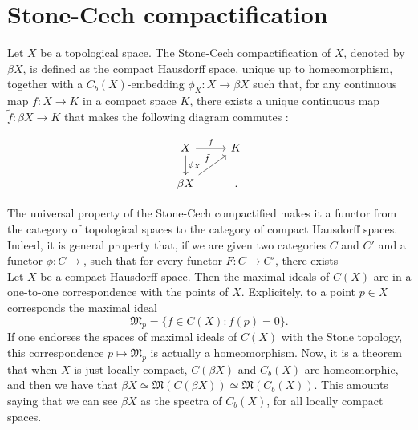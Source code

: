 \section{Stone-Cech compactification}

Let $X$ be a topological space. The Stone-Cech compactification of $X$, denoted by $\beta X$, is defined as the compact Hausdorff space, unique up to homeomorphism, together with a $C_b(X)$-embedding $\phi_X: X\rightarrow \beta X$ such that, for any continuous map $f : X\rightarrow K$ in a compact space $K$, there exists a unique continuous map $\tilde f : \beta X\rightarrow K$ that makes the following diagram commutes :

\[\begin{tikzcd} X \arrow{r}{f}\arrow{d}{\phi_X} & K \\
	\beta X \arrow{ur}{ \tilde f}& 
.\end{tikzcd}\]

The universal property of the Stone-Cech compactified makes it a functor from the category of topological spaces to the category of compact Hausdorff spaces. Indeed, it is general property that, if we are given two categories $C$ and $C'$ and a functor $\phi : C \rightarrow $, such that for every functor $F: C \rightarrow C'$, there exists \\

Let $X$ be a compact Hausdorff space. Then the maximal ideals of $C(X)$ are in a one-to-one correspondence with the points of $X$. Explicitely, to a point $p\in X$ corresponds the maximal ideal
\[\mathfrak M_p=\{f\in C(X) : f(p)=0\}.\]
If one endorses the  spaces of maximal ideals of $C(X)$ with the Stone topology, this correspondence $p\mapsto \mathfrak M_p$ is actually a homeomorphism. Now, it is a theorem that when $X$ is just locally compact, $C(\beta X)$ and $C_b(X)$ are homeomorphic, and then we have that $\beta X   \simeq\mathfrak M(C(\beta X)) \simeq \mathfrak M (C_b(X)) $. This amounts saying that we can see $\beta X $ as the spectra of $C_b(X)$, for all locally compact spaces.\\


